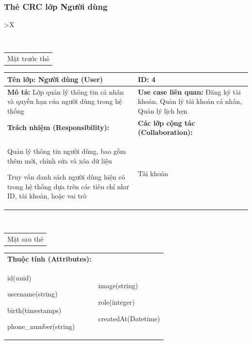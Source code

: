 \subsubsection{Thẻ CRC lớp Người dùng}

\begin{xltabular}{\textwidth}{
		>{\centering\arraybackslash}X
	}
	\caption{\bfseries \fontsize{12pt}{0pt}\selectfont Thẻ CRC lớp Người dùng}
	\\
	\begin{tabularx}{0.9\textwidth}{X}
		Mặt trước thẻ
	\end{tabularx}
	\begin{tabularx}{0.9\textwidth}{|X|X|}
		\hline
		\textbf{Tên lớp:} Người dùng (User)                                                      & \textbf{ID:} 4                                                                               \\
		\hline
		\textbf{Mô tả:} Lớp quản lý thông tin cá nhân và quyền hạn của người dùng trong hệ thống & \textbf{Use case liên quan:}  Đăng ký tài khoản, Quản lý tài khoản cá nhân, Quản lý lịch hẹn \\
		\hline
		\textbf{Trách nhiệm (Responsibility):}                                                   & \textbf{Các lớp cộng tác (Collaboration):}                                                   \\
		Quản lý thông tin người dùng, bao gồm thêm mới, chỉnh sửa và xóa dữ liệu

		Truy vấn danh sách người dùng hiện có trong hệ thống dựa trên các tiêu chí như ID, tài khoản, hoặc vai trò
		                                                                                         &
		Tài khoản
		\\
		\hline
	\end{tabularx}
	\\
	\begin{tabularx}{0.9\textwidth}{X}
		Mặt sau thẻ
	\end{tabularx}
	\begin{tabularx}{0.9\textwidth}{|X|X|}
		\hline
		\textbf{Thuộc tính (Attributes):} & \\
		id(uuid)

		username(string)

		birth(timestamps)

		phone\_number(string)
		                                  &
		image(string)

		role(integer)

		createdAt(Datetime)


\end{tabularx}
\end{xltabular}
